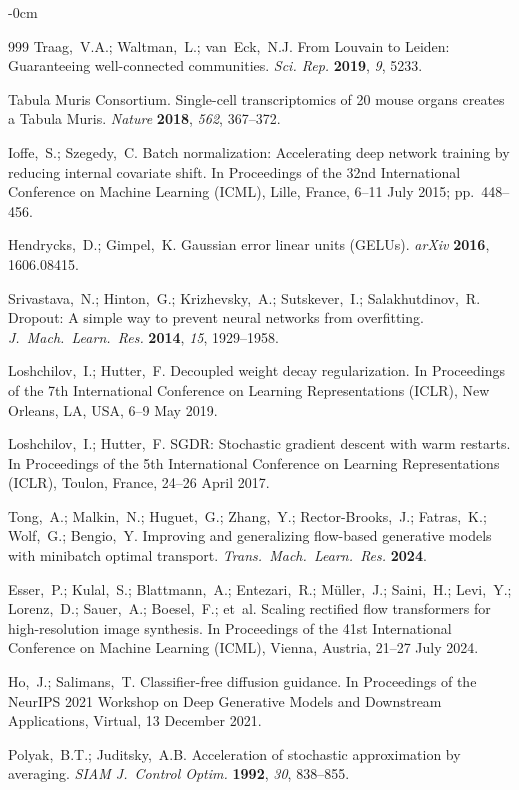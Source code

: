 \documentclass[genes,article,submit,pdftex,oneauthor]{Definitions/mdpi}
\begin{document}
\begin{adjustwidth}{-\extralength}{0cm}
\begin{thebibliography}{999}
Traag,~V.A.; Waltman,~L.; van~Eck,~N.J. From Louvain to Leiden: Guaranteeing well-connected communities. {\em Sci. Rep.} {\bf 2019}, {\em 9}, 5233.

Tabula Muris Consortium. Single-cell transcriptomics of 20 mouse organs creates a Tabula Muris. {\em Nature} {\bf 2018}, {\em 562}, 367--372.

Ioffe,~S.; Szegedy,~C. Batch normalization: Accelerating deep network training by reducing internal covariate shift. In Proceedings of the 32nd International Conference on Machine Learning (ICML), Lille, France, 6--11 July 2015; pp.\ 448--456.

Hendrycks,~D.; Gimpel,~K. Gaussian error linear units (GELUs). {\em arXiv} {\bf 2016}, 1606.08415.

Srivastava,~N.; Hinton,~G.; Krizhevsky,~A.; Sutskever,~I.; Salakhutdinov,~R. Dropout: A simple way to prevent neural networks from overfitting. {\em J.\ Mach.\ Learn.\ Res.} {\bf 2014}, {\em 15}, 1929--1958.

Loshchilov,~I.; Hutter,~F. Decoupled weight decay regularization. In Proceedings of the 7th International Conference on Learning Representations (ICLR), New Orleans, LA, USA, 6--9 May 2019.

Loshchilov,~I.; Hutter,~F. SGDR: Stochastic gradient descent with warm restarts. In Proceedings of the 5th International Conference on Learning Representations (ICLR), Toulon, France, 24--26 April 2017.

Tong,~A.; Malkin,~N.; Huguet,~G.; Zhang,~Y.; Rector-Brooks,~J.; Fatras,~K.; Wolf,~G.; Bengio,~Y. Improving and generalizing flow-based generative models with minibatch optimal transport. {\em Trans.\ Mach.\ Learn.\ Res.} {\bf 2024}.

Esser,~P.; Kulal,~S.; Blattmann,~A.; Entezari,~R.; M\"{u}ller,~J.; Saini,~H.; Levi,~Y.; Lorenz,~D.; Sauer,~A.; Boesel,~F.; et~al. Scaling rectified flow transformers for high-resolution image synthesis. In Proceedings of the 41st International Conference on Machine Learning (ICML), Vienna, Austria, 21--27 July 2024.

Ho,~J.; Salimans,~T. Classifier-free diffusion guidance. In Proceedings of the NeurIPS 2021 Workshop on Deep Generative Models and Downstream Applications, Virtual, 13 December 2021.

Polyak,~B.T.; Juditsky,~A.B. Acceleration of stochastic approximation by averaging. {\em SIAM J.\ Control Optim.} {\bf 1992}, {\em 30}, 838--855.


\end{thebibliography}
\end{adjustwidth}
\end{document}
